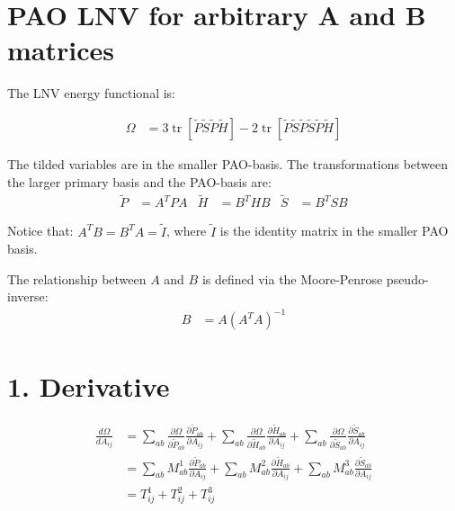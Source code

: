 \documentclass{article}
\newcommand{\tr}{\operatorname{tr}}
\begin{document}
\section*{PAO LNV for arbitrary A and B matrices}

The LNV energy functional is:

\begin{align*}
    \Omega & = 3\tr[\tilde P \tilde S \tilde P \tilde H ] - 2\tr[\tilde P \tilde S \tilde P \tilde S \tilde P \tilde H]
\end{align*}

The tilded variables are in the smaller PAO-basis. The transformations between the larger primary basis and the PAO-basis are:
\begin{align*}
    \tilde P & = A^T P A &
    \tilde H &= B^T  H B &
    \tilde S &= B^T  S B
\end{align*}

Notice that: $ A^T B = B^T A = \tilde I $, where $\tilde I$ is the identity matrix in the smaller PAO basis.

The relationship between $A$ and $B$ is defined via the Moore-Penrose pseudo-inverse:
\begin{align*}
    B & = A (A^T A) ^{-1}
\end{align*}



\newpage
\section*{1. Derivative}

\begin{align*}
    \frac{d \Omega}{d A_{ij}}
 &= \sum_{ab} \frac{\partial \Omega}{\partial \tilde P_{ab}}  \frac{\partial \tilde P_{ab}}{\partial A_{ij}}
  + \sum_{ab} \frac{\partial \Omega}{\partial \tilde H_{ab}}  \frac{\partial \tilde H_{ab}}{\partial A_{ij}}
  + \sum_{ab} \frac{\partial \Omega}{\partial \tilde S_{ab}}  \frac{\partial \tilde S_{ab}}{\partial A_{ij}}\\
 &= \sum_{ab} M^1_{ab} \frac{\partial \tilde P_{ab}}{\partial A_{ij}}
  + \sum_{ab} M^2_{ab} \frac{\partial \tilde H_{ab}}{\partial A_{ij}}
  + \sum_{ab} M^3_{ab} \frac{\partial \tilde S_{ab}}{\partial A_{ij}}\\
 &= T^1_{ij} + T^2_{ij} + T^3_{ij}
\end{align*}
\end{document}
